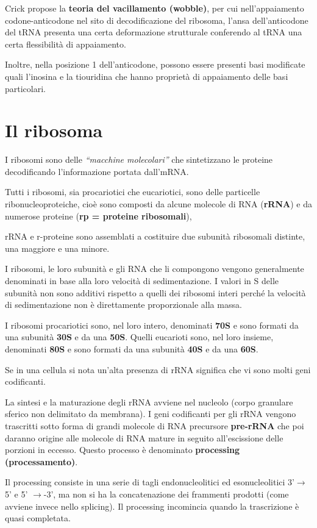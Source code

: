 \documentclass[11pt]{book}
\begin{document}
Crick propose la \textbf{teoria del vacillamento (wobble)}, per cui
nell'appaiamento codone-anticodone nel sito di decodificazione del
ribosoma, l'ansa dell'anticodone del tRNA presenta una certa
deformazione strutturale conferendo al tRNA una certa flessibilità di
appaiamento.

Inoltre, nella posizione 1 dell'anticodone, possono essere presenti basi
modificate quali l'inosina e la tiouridina che hanno proprietà di
appaiamento delle basi particolari.

\section{Il ribosoma}\label{il-ribosoma}

I ribosomi sono delle \emph{``macchine molecolari''} che sintetizzano le
proteine decodificando l'informazione portata dall'mRNA.

Tutti i ribosomi, sia procariotici che eucariotici, sono delle
particelle ribonucleoproteiche, cioè sono composti da alcune molecole di
RNA (\textbf{rRNA}) e da numerose proteine (\textbf{rp = proteine
ribosomali}),

rRNA e r-proteine sono assemblati a costituire due subunità ribosomali
distinte, una maggiore e una minore.

I ribosomi, le loro subunità e gli RNA che li compongono vengono
generalmente denominati in base alla loro velocità di sedimentazione. I
valori in S delle subunità non sono additivi rispetto a quelli dei
ribosomi interi perché la velocità di sedimentazione non è direttamente
proporzionale alla massa.

I ribosomi procariotici sono, nel loro intero, denominati \textbf{70S} e
sono formati da una subunità \textbf{30S} e da una \textbf{50S}. Quelli
eucarioti sono, nel loro insieme, denominati \textbf{80S} e sono formati
da una subunità \textbf{40S} e da una \textbf{60S}.

Se in una cellula si nota un'alta presenza di rRNA significa che vi sono
molti geni codificanti.

La sintesi e la maturazione degli rRNA avviene nel nucleolo (corpo
granulare sferico non delimitato da membrana). I geni codificanti per
gli rRNA vengono trascritti sotto forma di grandi molecole di RNA
precursore \textbf{pre-rRNA} che poi daranno origine alle molecole di
RNA mature in seguito all'escissione delle porzioni in eccesso. Questo
processo è denominato \textbf{processing (processamento)}.

Il processing consiste in una serie di tagli endonucleolitici ed
esonucleolitici 3'\(\rightarrow\) 5' e 5' \(\rightarrow\)-3', ma non si
ha la concatenazione dei frammenti prodotti (come avviene invece nello
splicing). Il processing incomincia quando la trascrizione è quasi
completata.
\end{document}
